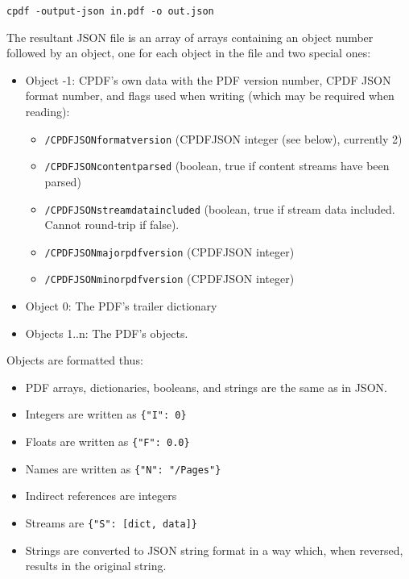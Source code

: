 \documentclass{book}
\begin{document}
  \begin{framed}
  \small\noindent\verb!cpdf -output-json in.pdf -o out.json!
  \end{framed}

The resultant JSON file is an array of arrays containing an object number followed by an
object, one for each object in the file and two special ones:

\begin{itemize}
\item Object -1: CPDF's own data with the PDF version number, CPDF JSON format
number, and flags used when writing (which may be required when reading):

\begin{itemize}
  \item \texttt{/CPDFJSONformatversion} (CPDFJSON integer (see below), currently 2)
  \item \texttt{/CPDFJSONcontentparsed} (boolean, true if content streams have been parsed)
  \item \texttt{/CPDFJSONstreamdataincluded} (boolean, true if stream data included. Cannot
  round-trip if false).
  \item \texttt{/CPDFJSONmajorpdfversion} (CPDFJSON integer)
  \item \texttt{/CPDFJSONminorpdfversion} (CPDFJSON integer)
\end{itemize}

\item Object 0: The PDF's trailer dictionary

\item Objects 1..n: The PDF's objects.
\end{itemize}

\noindent Objects are formatted thus:

\begin{itemize}
  \item PDF arrays, dictionaries, booleans, and strings are the same as in JSON.
  \item Integers are written as \texttt{\{"I":\ 0\}}
  \item Floats are written as \texttt{\{"F":\ 0.0\}}
  \item Names are written as \texttt{\{"N":\ "/Pages"\}}
  \item Indirect references are integers
  \item Streams are \texttt{\{"S":\ [dict, data]\}}
  \item Strings are converted to JSON string format in a way which, when reversed, results in the original string.
\end{itemize}
\end{document}
